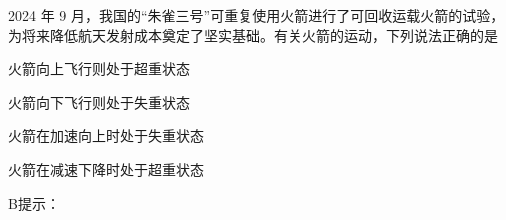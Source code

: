 2024 年 9 月，我国的“朱雀三号”可重复使用火箭进行了可回收运载火箭的试验，为将来降低航天发射成本奠定了坚实基础。有关火箭的运动，下列说法正确的是\paren[]
\begin{choices}
	\item 火箭向上飞行则处于超重状态
	\item 火箭向下飞行则处于失重状态
	\item 火箭在加速向上时处于失重状态
	\item 火箭在减速下降时处于超重状态
\end{choices}
\begin{answer}
    B\qquad 提示：
\end{answer}